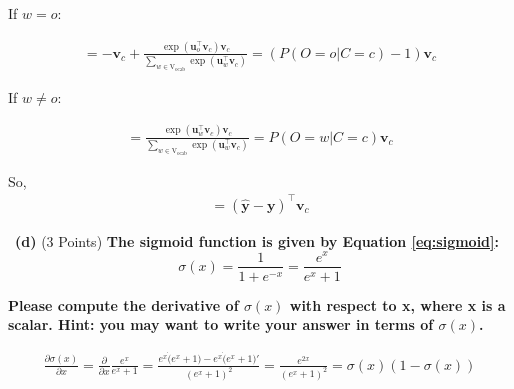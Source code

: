 \documentclass[a4 paper]{article}
\newcommand{\subproblem}[1]{~\newline\textbf{(#1)}}
\begin{document}
If $w=o$:

\begin{equation}
    \begin{aligned}
        = -\boldsymbol{v}_{c} + \frac{\exp \left(\boldsymbol{u}_{o}^{\top} \boldsymbol{v}_{c}\right) \boldsymbol{v}_{c}}{\sum_{w \in \mathrm{V_{ocab}}} \exp \left(\boldsymbol{u}_{w}^{\top} \boldsymbol{v}_{c}\right)}
        = (P(O=o | C=c)- 1)\boldsymbol{v}_{c}
    \end{aligned}
\end{equation}

If $w\neq o$:

\begin{equation}
    \begin{aligned}
        = \frac{\exp \left(\boldsymbol{u}_{w}^{\top} \boldsymbol{v}_{c}\right) \boldsymbol{v}_{c}}{\sum_{w \in \mathrm{V_{ocab}}} \exp \left(\boldsymbol{u}_{w}^{\top} \boldsymbol{v}_{c}\right)}
        = P(O=w | C=c)\boldsymbol{v}_{c}
    \end{aligned}
\end{equation}

So,
\begin{equation}
    \begin{aligned}
        = (\boldsymbol{\hat{y}} - \boldsymbol{y})^\top\boldsymbol{v}_{c}
    \end{aligned}
\end{equation}

\subproblem{d} (3 Points) \textbf{The sigmoid function is given by Equation \ref{eq:sigmoid}:}
\begin{equation}
    \sigma(x)=\frac{1}{1+e^{-x}}=\frac{e^{x}}{e^{x}+1}
    \label{eq:sigmoid}
\end{equation}

\textbf{Please compute the derivative of $\sigma(x)$ with respect to x, where x is a scalar. Hint: you may want to write your answer in terms of $\sigma(x)$.}

\begin{equation}
    \begin{aligned}
        \frac{\partial \sigma(x)}{\partial x}
         = \frac{\partial}{\partial x} \frac{e^{x}}{e^{x}+1}
         = \frac{e^{x} \dot (e^{x}+1) - e^{x} \dot (e^{x}+1)'}{(e^{x}+1)^2}
         = \frac{e^{2x}}{(e^{x}+1)^2}
         = \sigma(x) (1-\sigma(x))
    \end{aligned}
\end{equation}
\end{document}
